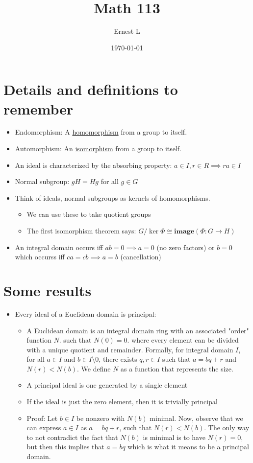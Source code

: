 \documentclass[11pt]{article}
\author{Ernest L}
\date{\today}
\title{Math 113}
\begin{document}
\maketitle
\section{Details and definitions to remember}

\begin{itemize}
    \item Endomorphism: A \underline{homomorphism} from a group to itself.
    \item Automorphism: An \underline{isomorphism} from a group to itself.
    \item An ideal is characterized by the absorbing property: $a \in I, r \in R \implies ra \in I$
    \item Normal subgroup: $gH = Hg$ for all $g \in G$
    \item Think of ideals, normal subgroups as kernels of homomorphisms.
    \begin{itemize}
        \item We can use these to take quotient groups 
        \item The first isomorphism theorem says: $G/\ker \Phi \cong \textbf{image} (\Phi: G \to H)$
    \end{itemize}
    \item An integral domain occurs iff $ab = 0 \implies a = 0$ (no zero factors) or $b = 0$ which occurss iff $ca = cb \implies a = b$ (cancellation)
\end{itemize}

\newpage
\section{Some results}
\begin{itemize}
    \item Every ideal of a Euclidean domain is principal:
        \begin{itemize}
            \item A Euclidean domain is an integral domain ring with an associated "order" function $N$. such that $N(0) = 0$. where every element can be divided with a unique quotient and remainder. Formally, for integral domain $I$, for all $a \in I$ and $b \in I \setminus 0$, there exists $q, r \in I$ such that $a = bq + r$ and $N(r) < N(b)$. We define $N$ as a function that represents the size. 
            \item A principal ideal is one generated by a single element
            \item If the ideal is just the zero element, then it is trivially principal
            \item Proof: Let $b \in I$ be nonzero with $N(b)$ minimal. Now, observe that we can express $a \in I$ as $a = bq + r$, such that $N(r) < N(b)$. The only way to not contradict the fact that $N(b)$ is minimal is to have $N(r) = 0$, but then this implies that $a = bq$ which is what it means to be a principal domain.
        \end{itemize}
\end{itemize}
\end{document}
